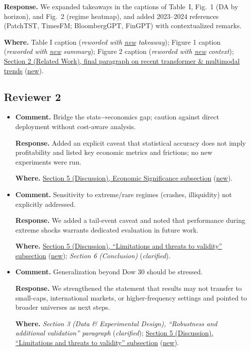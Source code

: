 \documentclass[11pt]{article}
\begin{document}
\begin{itemize}[leftmargin=1.2em]
  \textbf{Response.} We expanded takeaways in the captions of Table~I, Fig.~1 (DA by horizon), and Fig.~2 (regime heatmap), and added 2023--2024 references (PatchTST, TimesFM; BloombergGPT, FinGPT) with contextualized remarks.
  
  \textbf{Where.} Table I caption (\emph{reworded with \uline{new} takeaway}); Figure 1 caption (\emph{reworded with \uline{new} summary}); Figure 2 caption (\emph{reworded with \uline{new} context}); \uline{Section 2 (Related Work), final paragraph on recent transformer \& multimodal trends} (\uline{new}).
\end{itemize}

\subsection*{Reviewer 2}
\begin{itemize}[leftmargin=1.2em]
  \item \textbf{Comment.} Bridge the stats→economics gap; caution against direct deployment without cost-aware analysis.
  
  \textbf{Response.} Added an explicit caveat that statistical accuracy does not imply profitability and listed key economic metrics and frictions; no new experiments were run.
  
  \textbf{Where.} \uline{Section 5 (Discussion), Economic Significance subsection} (\uline{new}).

  \item \textbf{Comment.} Sensitivity to extreme/rare regimes (crashes, illiquidity) not explicitly addressed.
  
  \textbf{Response.} We added a tail-event caveat and noted that performance during extreme shocks warrants dedicated evaluation in future work.
  
  \textbf{Where.} \uline{Section 5 (Discussion), ``Limitations and threats to validity'' subsection} (\uline{new}); \emph{Section 6 (Conclusion)} (\emph{clarified}).

  \item \textbf{Comment.} Generalization beyond Dow 30 should be stressed.
  
  \textbf{Response.} We strengthened the statement that results may not transfer to small-caps, international markets, or higher-frequency settings and pointed to broader universes as next steps.
  
  \textbf{Where.} \emph{Section 3 (Data \& Experimental Design), ``Robustness and additional validation'' paragraph} (\emph{clarified}); \uline{Section 5 (Discussion), ``Limitations and threats to validity'' subsection} (\uline{new}).
\end{itemize}
\end{document}
